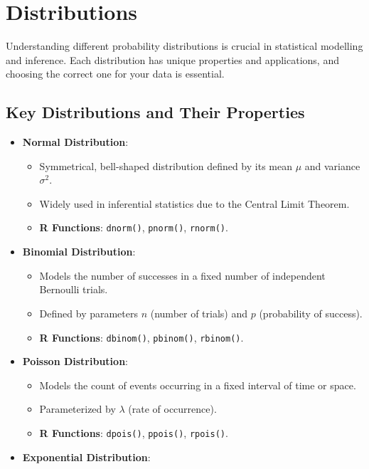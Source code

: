 \section{Distributions}

Understanding different probability distributions is crucial in statistical modelling and inference. Each distribution has unique properties and applications, and choosing the correct one for your data is essential.

\subsection{Key Distributions and Their Properties}

\begin{itemize}
    \item \textbf{Normal Distribution}:
    \begin{itemize}
        \item Symmetrical, bell-shaped distribution defined by its mean \(\mu\) and variance \(\sigma^2\).
        \item Widely used in inferential statistics due to the Central Limit Theorem.
        \item \textbf{R Functions}: \texttt{dnorm()}, \texttt{pnorm()}, \texttt{rnorm()}.
    \end{itemize}
    \item \textbf{Binomial Distribution}:
    \begin{itemize}
        \item Models the number of successes in a fixed number of independent Bernoulli trials.
        \item Defined by parameters \(n\) (number of trials) and \(p\) (probability of success).
        \item \textbf{R Functions}: \texttt{dbinom()}, \texttt{pbinom()}, \texttt{rbinom()}.
    \end{itemize}
    \item \textbf{Poisson Distribution}:
    \begin{itemize}
        \item Models the count of events occurring in a fixed interval of time or space.
        \item Parameterized by \(\lambda\) (rate of occurrence).
        \item \textbf{R Functions}: \texttt{dpois()}, \texttt{ppois()}, \texttt{rpois()}.
    \end{itemize}
    \item \textbf{Exponential Distribution}:

\end{itemize}
